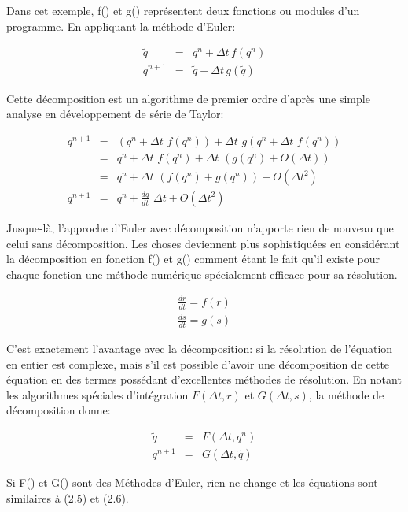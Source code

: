\documentclass[11pt]{report}
\begin{document}
Dans cet exemple, f() et g() représentent deux fonctions ou modules d'un programme. En appliquant la méthode d'Euler:

\begin{eqnarray}
\tilde{q} & = &  q^n + \Delta t \, f(q^n)\\
q^{n+1} & = & \tilde{q} + \Delta t \, g(\tilde{q})
\end{eqnarray}

Cette décomposition est un algorithme de premier ordre d'après une simple analyse en développement de série de Taylor:

\begin{eqnarray}
q^{n+1} & = & (q^n + \Delta t \,\, f(q^n)) + \Delta t \,\, g(q^n + \Delta t \,\, f(q^n))\\
& = & q^n + \Delta t \,\, f(q^n) + \Delta t \,\, (g(q^n) + O (\Delta t))\\
& = & q^n + \Delta t \,\, (f(q^n) + g(q^n)) + O(\Delta t^2)\\
q^{n+1} & = & q^n + \frac{dq}{dt} \,\, \Delta t + O (\Delta t^2)
\end{eqnarray}

Jusque-là, l'approche d'Euler avec décomposition n'apporte rien de nouveau que celui sans décomposition. Les choses deviennent plus sophistiquées en considérant la décomposition en fonction f() et g() comment étant le fait qu'il existe pour chaque fonction une méthode numérique spécialement efficace pour sa résolution.

\begin{eqnarray}
\frac{dr}{dt} = f(r)\\
\frac{ds}{dt} = g(s)
\end{eqnarray}

C'est exactement l'avantage avec la décomposition: si la résolution de l'équation en entier est complexe, mais s'il est possible d'avoir une décomposition de cette équation en des termes possédant d'excellentes méthodes de résolution. En notant les algorithmes spéciales d'intégration $F(\Delta t, r)$ et $ G(\Delta t, s) $, la méthode de décomposition donne:

\begin{eqnarray}
\tilde{q} & = & F(\Delta t, q^n)\\
q^{n+1} & = & G(\Delta t, \tilde{q})
\end{eqnarray}

Si F() et G() sont des Méthodes d'Euler, rien ne change et les équations sont similaires à (2.5) et (2.6).\newline
\end{document}
